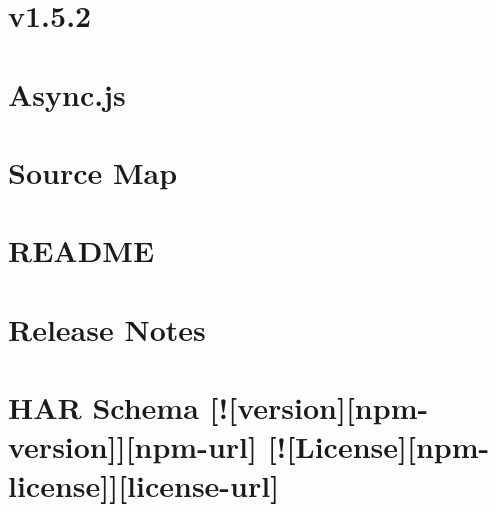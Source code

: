\documentclass[twoside]{book}
\newcommand{\+}{\discretionary{\mbox{\scriptsize$\hookleftarrow$}}{}{}}
\begin{document}
\chapter{v1.5.2}
\label{md__c_1_workspace_demo_src_main_script_node_modules_handlebars_node_modules_async__c_h_a_n_g_e_l_o_g}

\chapter{Async.\+js}
\label{md__c_1_workspace_demo_src_main_script_node_modules_handlebars_node_modules_async__r_e_a_d_m_e}

\chapter{Source Map}
\label{md__c_1_workspace_demo_src_main_script_node_modules_handlebars_node_modules_source-map__r_e_a_d_m_e}

\chapter{R\+E\+A\+D\+ME}
\label{md__c_1_workspace_demo_src_main_script_node_modules_handlebars__r_e_a_d_m_e}

\chapter{Release Notes}
\label{md__c_1_workspace_demo_src_main_script_node_modules_handlebars_release-notes}

\chapter{H\+AR Schema \mbox{[}!\mbox{[}version\mbox{]}\mbox{[}npm-\/version\mbox{]}\mbox{]}\mbox{[}npm-\/url\mbox{]} \mbox{[}!\mbox{[}License\mbox{]}\mbox{[}npm-\/license\mbox{]}\mbox{]}\mbox{[}license-\/url\mbox{]}}
\label{md__c_1_workspace_demo_src_main_script_node_modules_har-schema__r_e_a_d_m_e}

\end{document}
